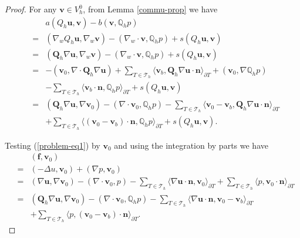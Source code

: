 \documentclass[leqno]{siamltex704}
\numberwithin{equation}{section}
\def\dQ{{\mathbb{Q}}}
\def\bQ{{\mathbf{Q}}}
\def\sumT{\sum_{T\in\mathcal{T}_h}}     %
\def\la{\langle}
\def\ra{\rangle_{\partial T}}
\def\bu{{\mathbf{u}}}
\def\bv{{\mathbf{v}}}
\def\bn{{\mathbf{n}}}
\def\bf{{\mathbf{f}}}
\begin{document}
\begin{proof}
  For any $\bv\in V_h^0$, from Lemma \ref{commu-prop} we have
  \begin{eqnarray} \nonumber
    &&a(Q_h\bu,\bv)-b(\bv,\dQ_h p)
    \\ \nonumber
    &=&(\nabla_w Q_h\bu,\nabla_w\bv)-(\nabla_w\cdot\bv,\dQ_h p)+ s(Q_h\bu,\bv)
    \\ \nonumber
    &=&(\bQ_h\nabla \bu,\nabla_w\bv)-(\nabla_w\cdot\bv,\dQ_h p)+ s(Q_h\bu,\bv)
    \\ \nonumber
    &=&-(\bv_0,\nabla\cdot\bQ_h\nabla \bu)+\sumT\la\bv_b,\bQ_h\nabla\bu\cdot\bn\ra
    +(\bv_0,\nabla\dQ_h p)
    \\ \nonumber
    &&-\sumT\la\bv_b\cdot\bn,\dQ_h p\ra + s(Q_h\bu,\bv)
    \\ \label{err-est1}
    &=&(\bQ_h\nabla\bu,\nabla\bv_0) - (\nabla\cdot\bv_0,\dQ_h p)
    -\sumT\la \bv_0-\bv_b,\bQ_h\nabla \bu\cdot\bn\ra
    \\ \nonumber
    && + \sumT\la (\bv_0-\bv_b)\cdot\bn,\dQ_h p\ra
    +s(Q_h\bu,\bv).
  \end{eqnarray}
  

  Testing (\ref{problem-eq1}) by $\bv_0$ and using the integration by parts we have
  \begin{eqnarray} \label{err-est2}
    &&(\bf,\bv_0)
    \\ \nonumber
    &=&(-\Delta u,\bv_0) + (\nabla p,\bv_0)
    \\ \nonumber
    &=& (\nabla\bu,\nabla\bv_0) - (\nabla\cdot\bv_0,p) 
    -\sumT\la \nabla\bu\cdot\bn,\bv_0\ra + \sumT\la p,\bv_0\cdot\bn\ra
    \\ \nonumber
    &=&(\bQ_h\nabla\bu,\nabla\bv_0) - (\nabla\cdot\bv_0,\dQ_h p)
    -\sumT\la \nabla\bu\cdot\bn,\bv_0-\bv_b\ra
    \\ \nonumber
    && + \sumT\la p,(\bv_0-\bv_b)\cdot\bn\ra.
  \end{eqnarray}
  
    


\end{proof}
\end{document}

